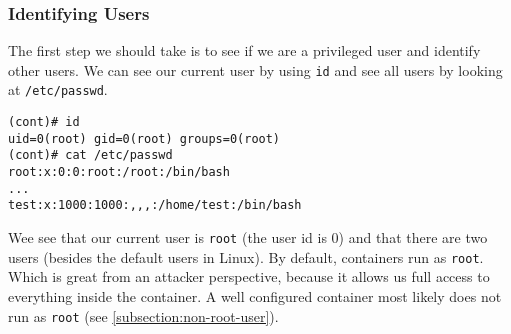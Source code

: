 \subsubsection{Identifying Users}
The first step we should take is to see if we are a privileged user and identify other users. We can see our current user by using \lstinline{id} and see all users by looking at \lstinline{/etc/passwd}.
\begin{lstlisting}[caption={Current and all user enumeration},captionpos=b]
(cont)# id
uid=0(root) gid=0(root) groups=0(root)
(cont)# cat /etc/passwd
root:x:0:0:root:/root:/bin/bash
...
test:x:1000:1000:,,,:/home/test:/bin/bash
\end{lstlisting}

Wee see that our current user is \lstinline{root} (the user id is 0) and that there are two users (besides the default users in Linux). By default, containers run as \lstinline{root}. Which is great from an attacker perspective, because it allows us full access to everything inside the container. A well configured container most likely does not run as \lstinline{root} (see \autoref{subsection:non-root-user}).

